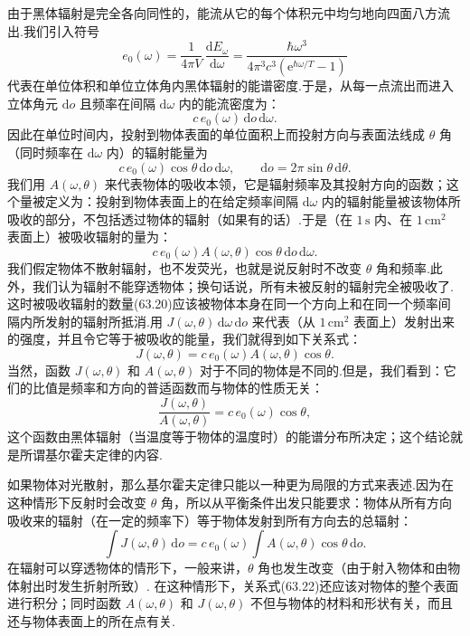 由于黑体辐射是完全各向同性的，能流从它的每个体积元中均匀地向四面八方流出.我们引入符号
\begin{equation}
  e_0(\omega)=\frac{1}{4\pi V}\,\frac{\mathrm{d}E_\omega}{\mathrm{d}\omega}
  =\frac{\hbar\omega^3}{4\pi^3c^3\left(\mathrm{e}^{\hbar\omega/T}-1\right)}
\end{equation}
代表在单位体积和单位立体角内黑体辐射的能谱密度.于是，从每一点流出而进入立体角元 $\mathrm{d}o$ 且频率在间隔 $\mathrm{d}\omega$ 内的能流密度为：
\begin{equation*}
  c\,e_0(\omega)\,\mathrm{d}o\,\mathrm{d}\omega.
\end{equation*}
因此在单位时间内，投射到物体表面的单位面积上而投射方向与表面法线成 $\theta$ 角（同时频率在 $\mathrm{d}\omega$ 内）的辐射能量为
\begin{equation*}
  c\,e_0(\omega)\cos\theta\,\mathrm{d}o\,\mathrm{d}\omega,\qquad
  \mathrm{d}o=2\pi\sin\theta\,\mathrm{d}\theta.
\end{equation*}
我们用 $A(\omega,\theta)$ 来代表物体的吸收本领，它是辐射频率及其投射方向的函数；这个量被定义为：投射到物体表面上的在给定频率间隔 $\mathrm{d}\omega$ 内的辐射能量被该物体所吸收的部分，不包括透过物体的辐射（如果有的话）.于是（在 $1\,\mathrm{s}$ 内、在 $1\,\mathrm{cm}^2$ 表面上）被吸收辐射的量为：
\begin{equation}
  c\,e_0(\omega)A(\omega,\theta)\cos\theta\,\mathrm{d}o\,\mathrm{d}\omega.
\end{equation}
我们假定物体不散射辐射，也不发荧光，也就是说反射时不改变 $\theta$ 角和频率.此外，我们认为辐射不能穿透物体；换句话说，所有未被反射的辐射完全被吸收了.这时被吸收辐射的数量(63.20)应该被物体本身在同一个方向上和在同一个频率间隔内所发射的辐射所抵消.用 $J(\omega,\theta)\,\mathrm{d}\omega\,\mathrm{d}o$ 来代表（从 $1\,\mathrm{cm}^2$ 表面上）发射出来的强度，并且令它等于被吸收的能量，我们就得到如下关系式：
\begin{equation}
  J(\omega,\theta)=c\,e_0(\omega)A(\omega,\theta)\cos\theta.
\end{equation}
当然，函数 $J(\omega,\theta)$ 和 $A(\omega,\theta)$ 对于不同的物体是不同的.但是，我们看到：它们的比值是频率和方向的普适函数而与物体的性质无关：
\begin{equation*}
  \frac{J(\omega,\theta)}{A(\omega,\theta)}=c\,e_0(\omega)\cos\theta,
\end{equation*}
这个函数由黑体辐射（当温度等于物体的温度时）的能谱分布所决定；这个结论就是所谓基尔霍夫定律的内容.

如果物体对光散射，那么基尔霍夫定律只能以一种更为局限的方式来表述.因为在这种情形下反射时会改变 $\theta$ 角，所以从平衡条件出发只能要求：物体从所有方向吸收来的辐射（在一定的频率下）等于物体发射到所有方向去的总辐射：
\begin{equation}
  \int J(\omega,\theta)\,\mathrm{d}o
  =c\,e_0(\omega)\int A(\omega,\theta)\cos\theta\,\mathrm{d}o.
\end{equation}
在辐射可以穿透物体的情形下，一般来讲，$\theta$ 角也发生改变（由于射入物体和由物体射出时发生折射所致）. 在这种情形下，关系式(63.22)还应该对物体的整个表面进行积分；同时函数 $A(\omega,\theta)$ 和 $J(\omega,\theta)$ 不但与物体的材料和形状有关，而且还与物体表面上的所在点有关.


